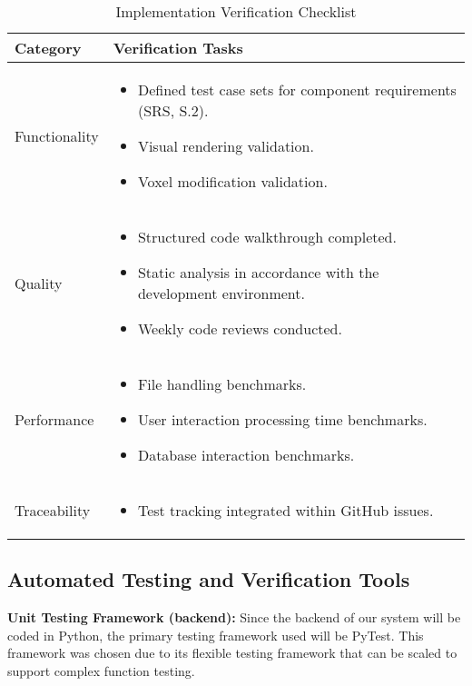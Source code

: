 \documentclass[12pt, titlepage]{article}
\begin{document}
\begin{table}[H]
\centering
\caption{Implementation Verification Checklist}
\renewcommand{\arraystretch}{1.3}
\setlength{\tabcolsep}{8pt}
\begin{tabular}{|p{}|p{}|}
\hline
\textbf{Category} & \textbf{Verification Tasks} \\ \hline
Functionality &
\begin{itemize}
\item Defined test case sets for component requirements (SRS, S.2).
\item Visual rendering validation.
\item Voxel modification validation.
\end{itemize} \\ \hline
Quality &
\begin{itemize}
\item Structured code walkthrough completed.
\item Static analysis in accordance with the development environment.
\item Weekly code reviews conducted.
\end{itemize} \\ \hline
Performance &
\begin{itemize}
\item File handling benchmarks.
\item User interaction processing time benchmarks.
\item Database interaction benchmarks.
\end{itemize} \\ \hline
Traceability &
\begin{itemize}
\item Test tracking integrated within GitHub issues.
\end{itemize} \\ \hline
\end{tabular}
\end{table}


\subsection{Automated Testing and Verification Tools}

\textbf{Unit Testing Framework (backend):} Since the backend of our system will be coded in Python, the primary testing framework used will be PyTest. This framework was chosen due to its flexible testing framework that can be scaled to support complex function testing. \\
\end{document}
